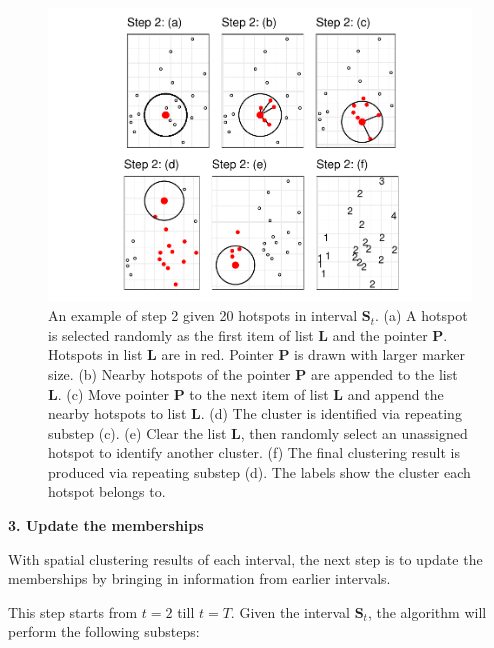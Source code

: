 \begin{Schunk}
\begin{figure}

{\centering \includegraphics[width=0.8\linewidth]{clustering_paper_files/figure-latex/step2figs-1} 

}

\caption{An example of step 2 given 20 hotspots in interval $\boldsymbol{S}_t$. (a) A hotspot is selected randomly as the first item of list $\boldsymbol{L}$ and the pointer $\boldsymbol{P}$. Hotspots in list $\boldsymbol{L}$ are in red. Pointer $\boldsymbol{P}$ is drawn with larger marker size. (b) Nearby hotspots of the pointer $\boldsymbol{P}$ are appended to the list $\boldsymbol{L}$. (c) Move pointer $\boldsymbol{P}$ to the next item of list $\boldsymbol{L}$ and append the nearby hotspots to list $\boldsymbol{L}$. (d) The cluster is identified via repeating substep (c). (e) Clear the list $\boldsymbol{L}$, then randomly select an unassigned hotspot to identify another cluster. (f) The final clustering result is produced via repeating substep (d). The labels show the cluster each hotspot belongs to.}\label{fig:step2figs}
\end{figure}
\end{Schunk}

\textbf{3. Update the memberships}

With spatial clustering results of each interval, the next step is to
update the memberships by bringing in information from earlier
intervals.

This step starts from \(t=2\) till \(t=T\). Given the interval
\(\boldsymbol{S}_t\), the algorithm will perform the following substeps:

